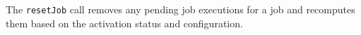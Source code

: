 The \verb+resetJob+ call removes any pending job executions for a job and recomputes them based on
the activation status and configuration.
